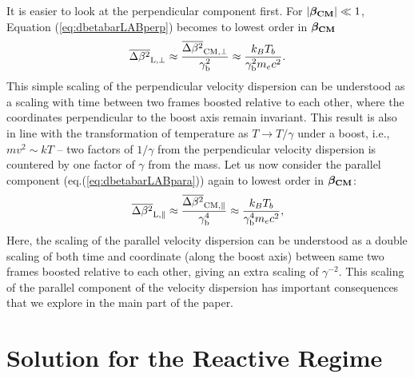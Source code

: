 \documentclass[usenatbib,iop,apj,numberedappendix]{aeb_emulateapj_2015}
\newcommand\bmath[1] {\mbox{\boldmath$\rm #1$}}
\newcommand{\betaCM}{\ensuremath{\bmath{\beta_{\rm CM}}}}
\newcommand{\dbetabarLABpara}{\ensuremath{\overline{\Delta\beta^2}_{\rm L, \parallel}}}
\newcommand{\dbetabarLABperp}{\ensuremath{\overline{\Delta\beta^2}_{\rm L, \perp}}}
\newcommand{\dbetabarCMpara}{\ensuremath{\overline{\Delta\beta^2}_{\rm CM, \parallel}}}
\newcommand{\dbetabarCMperp}{\ensuremath{\overline{\Delta\beta^2}_{\rm CM, \perp}}}
\newcommand{\gammabeam}{\ensuremath{\gamma_{\rm b}}}
\begin{document}
\begin{appendix}
It is easier to look at the perpendicular component first.  For $\left|\betaCM\right| \ll 1$, Equation (\ref{eq:dbetabarLABperp}) becomes to lowest order in $\betaCM$ 
\begin{equation}
 \dbetabarLABperp \approx \frac{\dbetabarCMperp}{\gammabeam^2} \approx \frac {k_B T_b}{\gammabeam^2 m_e c^2 }.
\end{equation}
This simple scaling of the perpendicular velocity dispersion can be understood as a scaling with time between two frames boosted relative to each other, where the coordinates perpendicular to the boost axis remain invariant.  This result is also in line with the transformation of temperature as $T\rightarrow T/\gamma$ under a boost, i.e., $mv^2 \sim kT$ -- two factors of $1/\gamma$ from the perpendicular velocity dispersion is countered by one factor of $\gamma$ from the mass.  Let us now consider the parallel component (eq.(\ref{eq:dbetabarLABpara})) again to lowest order in $\betaCM$: 
\begin{equation}
 \dbetabarLABpara \approx \frac{\dbetabarCMpara}{\gammabeam^{4}}  \approx \frac {k_B T_b}{\gammabeam^4 m_e c^2 },
\end{equation}
Here, the scaling of the parallel velocity dispersion can be understood as a double scaling of both time and coordinate (along the boost axis) between same two frames boosted relative to each other, giving an extra scaling of $\gamma^{-2}$.
This scaling of the parallel component of the velocity dispersion has important consequences that we explore in the main part of the paper.  



\section{Solution for the Reactive Regime}\label{sec:solution reactive}


\end{appendix}
\end{document}
